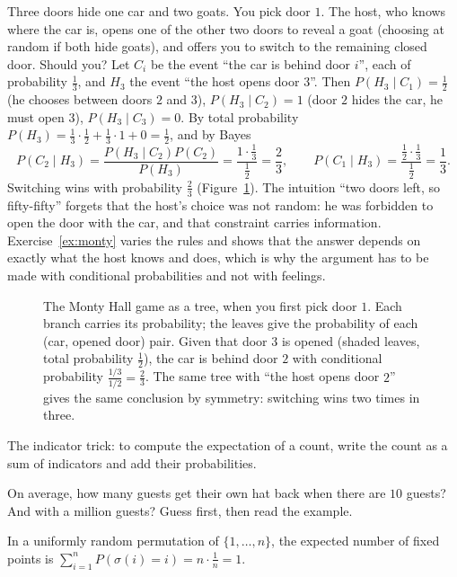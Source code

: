\begin{examplex}
Three doors hide one car and two goats. You pick door $1$. The host, who knows where the car is, opens one of the other two doors to reveal a goat (choosing at random if both hide goats), and offers you to switch to the remaining closed door. Should you? Let $C_i$ be the event ``the car is behind door $i$'', each of probability $\frac13$, and $H_3$ the event ``the host opens door $3$''. Then $P(H_3\mid C_1)=\frac12$ (he chooses between doors $2$ and $3$), $P(H_3\mid C_2)=1$ (door $2$ hides the car, he must open $3$), $P(H_3\mid C_3)=0$. By total probability $P(H_3)=\frac13\cdot\frac12+\frac13\cdot1+0=\frac12$, and by Bayes
\[
P(C_2\mid H_3)=\frac{P(H_3\mid C_2)P(C_2)}{P(H_3)}=\frac{1\cdot\frac13}{\frac12}=\frac23,\qquad P(C_1\mid H_3)=\frac{\frac12\cdot\frac13}{\frac12}=\frac13 .
\]
Switching wins with probability $\frac23$ (Figure~\ref{fig:monty}). The intuition ``two doors left, so fifty-fifty'' forgets that the host's choice was not random: he was forbidden to open the door with the car, and that constraint carries information. Exercise~\ref{ex:monty} varies the rules and shows that the answer depends on exactly what the host knows and does, which is why the argument has to be made with conditional probabilities and not with feelings.
\end{examplex}

\begin{figure}[ht]
\centering
{}
\caption{The Monty Hall game as a tree, when you first pick door $1$. Each branch carries its probability; the leaves give the probability of each (car, opened door) pair. Given that door $3$ is opened (shaded leaves, total probability $\frac12$), the car is behind door $2$ with conditional probability $\frac{1/3}{1/2}=\frac23$. The same tree with ``the host opens door $2$'' gives the same conclusion by symmetry: switching wins two times in three.}
\label{fig:monty}
\end{figure}

The indicator trick: to compute the expectation of a count, write the count as a sum of indicators and add their probabilities.

\begin{think}
On average, how many guests get their own hat back when there are $10$ guests? And with a million guests? Guess first, then read the example.
\end{think}

\begin{example}
In a uniformly random permutation of $\{1,\dots,n\}$, the expected number of fixed points is $\sum_{i=1}^nP(\sigma(i)=i)=n\cdot\frac1n=1$.
\end{example}

